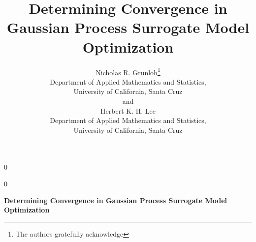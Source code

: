 \documentclass[12pt]{article}
\newcommand{\blind}{0}
\begin{document}
\def\spacingset#1{\renewcommand{\baselinestretch}%
{#1}\small\normalsize} \spacingset{1}

%
%
\blind
{
\title{{\LARGE\bf Determining Convergence in Gaussian Process Surrogate Model Optimization}}
\author{Nicholas R. Grunloh\thanks{
    The authors gratefully acknowledge}\hspace{.2cm}\\
    Department of Applied Mathematics and Statistics,\\ University of California, Santa Cruz\\
    and \\
    Herbert K. H. Lee \\
    Department of Applied Mathematics and Statistics,\\ University of California, Santa Cruz}
%
  \maketitle
} \fi

\blind
{
  \bigskip
  \bigskip
  \bigskip
  \begin{center}
    {\LARGE\bf Determining Convergence in Gaussian Process Surrogate Model Optimization}
  \end{center}
  \medskip
} \fi

%

\end{document}
